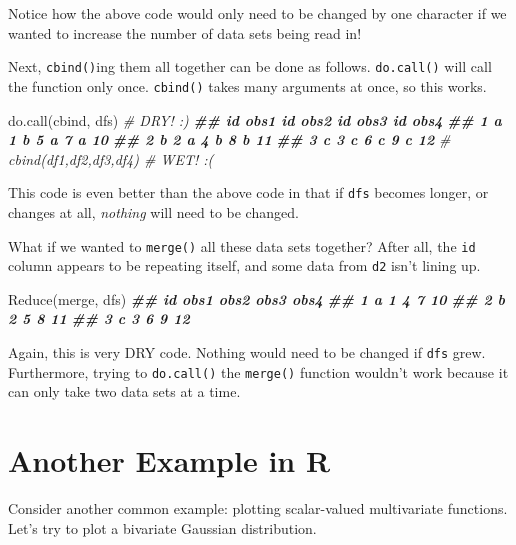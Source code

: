 \documentclass[
  12pt,
  krantz2]{krantz}
\makeatletter
\newenvironment{Shaded}{\begin{snugshade}}{\end{snugshade}}
\newcommand{\CommentTok}[1]{\textcolor[rgb]{0.37,0.37,0.37}{\textit{#1}}}
\newcommand{\DocumentationTok}[1]{\textcolor[rgb]{0.37,0.37,0.37}{\textbf{\textit{#1}}}}
\newcommand{\FunctionTok}[1]{\textcolor[rgb]{0,0,0}{#1}}
\newcommand{\NormalTok}[1]{#1}
\newenvironment{kframe}{%
\medskip{}
\setlength{\fboxsep}{.8em}
 \def\at@end@of@kframe{}%
 \ifinner\ifhmode%
  \def\at@end@of@kframe{\end{minipage}}%
  \begin{minipage}{\columnwidth}%
 \fi\fi%
 \def\FrameCommand##1{\hskip\@totalleftmargin \hskip-\fboxsep
 \colorbox{shadecolor}{##1}\hskip-\fboxsep
     \hskip-\linewidth \hskip-\@totalleftmargin \hskip\columnwidth}%
 \MakeFramed {\advance\hsize-\width
   \@totalleftmargin\z@ \linewidth\hsize
   \@setminipage}}%
 {\par\unskip\endMakeFramed%
 \at@end@of@kframe}
\renewenvironment{Shaded}{\begin{kframe}}{\end{kframe}}
\makeatother
\begin{document}
Notice how the above code would only need to be changed by one character if we wanted to increase the number of data sets being read in!

Next, \texttt{cbind()}ing them all together can be done as follows. \texttt{do.call()} will call the function only once. \texttt{cbind()} takes many arguments at once, so this works.

\begin{Shaded}
\begin{Highlighting}[]
\FunctionTok{do.call}\NormalTok{(cbind, dfs) }\CommentTok{\# DRY! :)}
\DocumentationTok{\#\#   id obs1 id obs2 id obs3 id obs4}
\DocumentationTok{\#\# 1  a    1  b    5  a    7  a   10}
\DocumentationTok{\#\# 2  b    2  a    4  b    8  b   11}
\DocumentationTok{\#\# 3  c    3  c    6  c    9  c   12}
\CommentTok{\# cbind(df1,df2,df3,df4) \# WET! :(}
\end{Highlighting}
\end{Shaded}

This code is even better than the above code in that if \texttt{dfs} becomes longer, or changes at all, \emph{nothing} will need to be changed.

What if we wanted to \texttt{merge()} all these data sets together? After all, the \texttt{id} column appears to be repeating itself, and some data from \texttt{d2} isn't lining up.

\begin{Shaded}
\begin{Highlighting}[]
\FunctionTok{Reduce}\NormalTok{(merge, dfs)}
\DocumentationTok{\#\#   id obs1 obs2 obs3 obs4}
\DocumentationTok{\#\# 1  a    1    4    7   10}
\DocumentationTok{\#\# 2  b    2    5    8   11}
\DocumentationTok{\#\# 3  c    3    6    9   12}
\end{Highlighting}
\end{Shaded}

Again, this is very DRY code. Nothing would need to be changed if \texttt{dfs} grew. Furthermore, trying to \texttt{do.call()} the \texttt{merge()} function wouldn't work because it can only take two data sets at a time.

\hypertarget{another-example-in-r}{%
\section{Another Example in R}\label{another-example-in-r}}

Consider another common example: plotting scalar-valued multivariate functions. Let's try to plot a bivariate Gaussian distribution.
\end{document}
